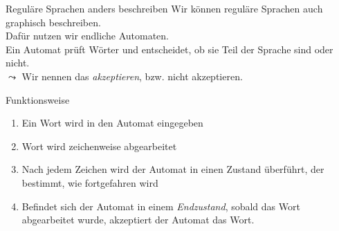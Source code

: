 \begin{frame}[fragile]{Reguläre Sprachen anders beschreiben}
    Wir können reguläre Sprachen auch graphisch beschreiben.\\
    Dafür nutzen wir \alert{endliche Automaten}.\\
    Ein Automat prüft Wörter und entscheidet, ob sie Teil der Sprache sind oder nicht.\\
    $\leadsto$ Wir nennen das \alert{\emph{akzeptieren}}, bzw. nicht akzeptieren.
    \begin{alertblock}{Funktionsweise}
    \begin{enumerate}
        \item Ein Wort wird in den Automat eingegeben
        \item Wort wird zeichenweise abgearbeitet
        \item Nach jedem Zeichen wird der Automat in einen Zustand überführt, der bestimmt, wie fortgefahren wird
        \item Befindet sich der Automat in einem \emph{Endzustand}, sobald das Wort abgearbeitet wurde, akzeptiert der Automat das Wort.
    \end{enumerate}
    \end{alertblock}
\end{frame}

